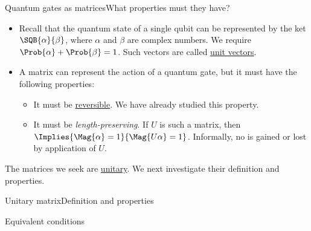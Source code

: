\begin{frame}{Quantum gates as matrices}{What properties must they have?}

\begin{itemize}
    \item Recall that the quantum state of a single qubit can be represented by the ket
    $\SQB{\alpha}{\beta}$, where $\alpha$ and $\beta$ are complex numbers.  We require $\Prob{\alpha}+\Prob{\beta}=1$.  Such vectors are called \href{https://en.wikipedia.org/wiki/Unit_vector}{unit vectors}.
    \item A matrix can represent the action of a quantum gate, but it must have the following properties:
    \begin{itemize}
        \item It must be \href{https://en.wikipedia.org/wiki/Reversible_computing}{reversible}. We have already studied this property.
        \item It must be \emph{length-preserving}.  If $U$ is such a matrix, then $\Implies{\Mag{\alpha}=1}{\Mag{U\alpha}=1}$. Informally, no  is gained or lost by application of $U$.
    \end{itemize}
     
\end{itemize}
    The matrices we seek are \href{https://en.wikipedia.org/wiki/Unitary_matrix}{unitary}.   We next investigate their definition and properties.
\end{frame}

\begin{frame}{Unitary matrix}{Definition and properties }

\begin{center}Equivalent conditions\end{center}


\end{frame}

